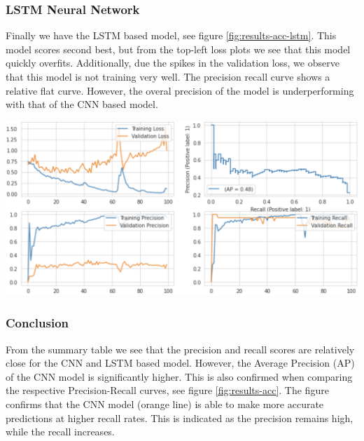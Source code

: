 \begin{minipage}{\textwidth}
\subsubsection{LSTM Neural Network}

Finally we have the LSTM based model, see figure \ref{fig:results-acc-lstm}. This model scores second best, but from the top-left loss plots we see that this model quickly overfits. Additionally, due the spikes in the validation loss, we observe that this model is not training very well. The precision recall curve shows a relative flat curve. However, the overal precision of the model is underperforming with that of the CNN based model.
\baselineskip

\begin{center}
\includegraphics[width=.75\textwidth,keepaspectratio]{images/6_results/results-acc-lstm.png}
\end{center}
\captionsetup{width=.90\textwidth}
\label{fig:results-acc-lstm}
\end{minipage}

\subsubsection{Conclusion}

From the summary table we see that the precision and recall scores are relatively close for the CNN and LSTM based model. However, the Average Precision (AP) of the CNN model is significantly higher. This is also confirmed when comparing the respective Precision-Recall curves, see figure \ref{fig:results-acc}. The figure confirms that the CNN model (orange line) is able to make more accurate predictions at higher recall rates. This is indicated as the precision remains high, while the recall increases.

